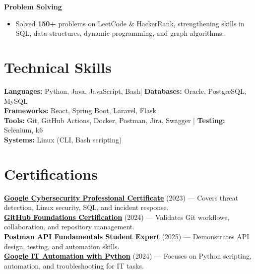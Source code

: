 \documentclass[a4paper]{article}
\newcommand{\subheading}[1]{\noindent \textbf{#1} \\}
\begin{document}
\vspace{0.5em}

\subheading{Problem Solving}
\begin{itemize}[noitemsep, topsep=0pt]
    \item Solved \textbf{150+} problems on LeetCode \& HackerRank, strengthening skills in SQL, data structures, dynamic programming, and graph algorithms.
\end{itemize}




\section{Technical Skills}
\begin{itemize}[leftmargin=0.15in, label={}]
\small{\item{
\textbf{Languages:} Python, Java, JavaScript, Bash\;|\;
\textbf{Databases:} Oracle, PostgreSQL, MySQL\\
\textbf{Frameworks:} React, Spring Boot, Laravel, Flask\\
\textbf{Tools:} Git, GitHub Actions, Docker, Postman, Jira, Swagger \;|\;
\textbf{Testing:} Selenium, k6\\
\textbf{Systems:} Linux (CLI, Bash scripting)
}}
\end{itemize}




\section{Certifications}
 \begin{itemize}[leftmargin=0.15in, label={}]
    \small{\item{
    \href{https://coursera.org/share/44fd8f381cb39ac45892569cdf6f7674}{\textcolor{black}{\textbf{Google Cybersecurity Professional Certificate}}} (2023) — Covers threat detection, Linux security, SQL, and incident response. \\
    \href{https://www.credly.com/badges/d5c30c19-02db-4c5f-9bc9-4bd0f4b6a89e/public_url}{\textcolor{black}{\textbf{GitHub Foundations Certification}}} (2024) — Validates Git workflows, collaboration, and repository management. \\
    \href{https://badges.parchment.com/public/assertions/ZF0yx-i3T1CvXYwDLEUneA?identity__email=sakib.sadman.badhon\%40g.bracu.ac.bd}{\textcolor{black}{\textbf{Postman API Fundamentals Student Expert}}} (2025) — Demonstrates API design, testing, and automation skills. \\
    \href{https://coursera.org/share/2afadc6ce043cc25337eb8c8fe61c9b6}{\textcolor{black}{\textbf{Google IT Automation with Python}}} (2024) — Focuses on Python scripting, automation, and troubleshooting for IT tasks. \\
    }}
 \end{itemize}


\end{document}
